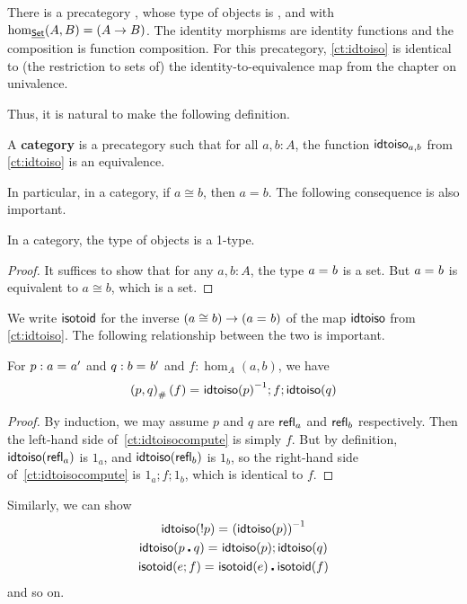 \begin{eg}\label{ct:precatset}
  There is a precategory \uset, whose type of objects is \set, and with $\hom_{\underline{\mathsf{Set}}}(A,B) = (A\to B)$.
  The identity morphisms are identity functions and the composition is function composition.
  For this precategory, \autoref{ct:idtoiso} is identical to (the restriction to sets of) the identity-to-equivalence map from the chapter on univalence.
\end{eg}

Thus, it is natural to make the following definition.

\begin{defn}\label{ct:category}
  A \textbf{category} is a precategory such that for all $a,b:A$, the function $\mathsf{idtoiso}_{a,b}$ from \autoref{ct:idtoiso} is an equivalence.
\end{defn}

In particular, in a category, if $a\cong b$, then $a=b$.  The following consequence is also important.

\begin{lem}\label{ct:obj-1type}
  In a category, the type of objects is a 1-type.
\end{lem}
\begin{proof}
  It suffices to show that for any $a,b:A$, the type $a =_{} b$ is a set.
  But $a =_{} b$ is equivalent to $a \cong b$, which is a set.
\end{proof}

We write $\mathsf{isotoid}$ for the inverse $(a\cong b) \to (a =_{} b)$ of the map $\mathsf{idtoiso}$ from \autoref{ct:idtoiso}.
The following relationship between the two is important.

\begin{lem}\label{ct:idtoiso-trans}
  For $p:a =_{} a'$ and $q:b =_{} b'$ and $f:\hom_A(a,b)$, we have
  \begin{equation}\label{ct:idtoisocompute}
    {(p,q)}_{\#}\left({f}\right) =_{} {\mathsf{idtoiso}(p)}^{-1};f;\mathsf{idtoiso}(q)
  \end{equation}
\end{lem}
\begin{proof}
  By induction, we may assume $p$ and $q$ are $\mathsf{refl}_{a}$ and $\mathsf{refl}_{b}$ respectively.  Then the left-hand side of~\eqref{ct:idtoisocompute} is simply $f$.
  But by definition, $\mathsf{idtoiso}(\mathsf{refl}_{a})$ is $1_a$, and $\mathsf{idtoiso}(\mathsf{refl}_{b})$ is $1_b$, so the right-hand side of~\eqref{ct:idtoisocompute} is $1_a;f;1_b$, which is identical to $f$.
\end{proof}

Similarly, we can show
\begin{gather}
  \mathsf{idtoiso}(!{p}) =_{} {(\mathsf{idtoiso}(p))}^{-1}\\
  \mathsf{idtoiso}(p\centerdot q) =_{} \mathsf{idtoiso}(p);\mathsf{idtoiso}(q)\\
  \mathsf{isotoid}(e;f) =_{} \mathsf{isotoid}(e)\centerdot \mathsf{isotoid}(f)
\end{gather}
and so on.


